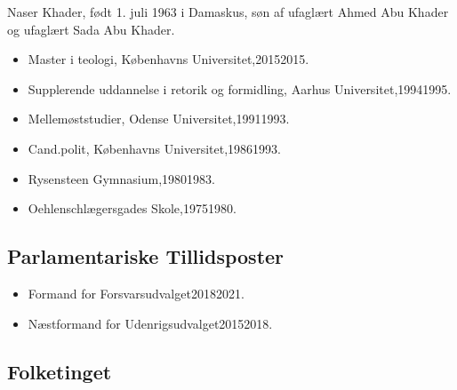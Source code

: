 \documentclass[11pt, a4paper]{awesome-cv}
\begin{document}
\makecvheader[R]
\makelettertitle
\begin{cvletter}
Naser Khader, født 1. juli 1963 i Damaskus, søn af ufaglært Ahmed Abu Khader og ufaglært Sada Abu Khader.

\begin{itemize}
\item Master i teologi, Københavns Universitet,20152015.
\item Supplerende uddannelse i retorik og formidling, Aarhus Universitet,19941995.
\item Mellemøststudier, Odense Universitet,19911993.
\item Cand.polit, Københavns Universitet,19861993.
\item Rysensteen Gymnasium,19801983.
\item Oehlenschlægersgades Skole,19751980.
\end{itemize}
\subsection*{Parlamentariske Tillidsposter}
\begin{itemize}
\item Formand for Forsvarsudvalget20182021.
\item Næstformand for Udenrigsudvalget20152018.
\end{itemize}
\subsection*{Folketinget}

\end{cvletter}
\end{document}
